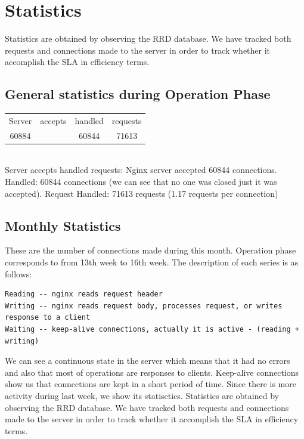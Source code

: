 \section{Statistics}
Statistics are obtained by observing the RRD database.  We have tracked both requests and connections made to the server in order to track whether it accomplish the SLA in efficiency terms.
\subsection{General statistics during Operation Phase}
\begin{tabular}{ c c c c }
Server & accepts & handled & requests \\
60884 &  & 60844 & 71613 \\
\end{tabular} \\
Server accepts handled requests: Nginx server accepted 60844 connections.
Handled: 60844 connections (we can see that no one was closed just it was accepted).
Request Handled: 71613 requests (1.17 requests per connection)
\subsection{Monthly Statistics}
These are the number of connections made during this month.  Operation phase corresponds to from 13th week to 16th week. The description of each series is as follows:
\begin{lstlisting}
Reading -- nginx reads request header
Writing -- nginx reads request body, processes request, or writes response to a client
Waiting -- keep-alive connections, actually it is active - (reading + writing)
\end{lstlisting}
We can see a continuous state in the server which means that it had no errors and also that most of operations are responses to clients. Keep-alive connections show us that connections are kept in a short period of time.
Since there is more activity during last week, we show its statisctics.
Statistics are obtained by observing the RRD database.  We have tracked both requests and connections made to the server in order to track whether it accomplish the SLA in efficiency terms.
